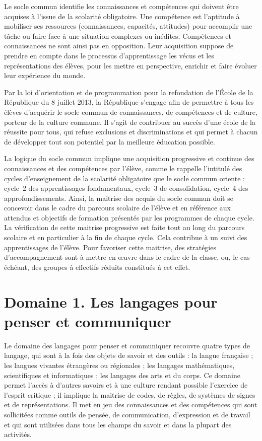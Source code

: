 Le socle commun identifie les connaissances et compétences qui doivent être acquises à l’issue de la scolarité obligatoire. Une compétence est l’aptitude à mobiliser ses ressources (connaissances, capacités, attitudes) pour accomplir une tâche ou faire face à une situation complexes ou inédites. Compétences et connaissances ne sont ainsi pas en opposition. Leur acquisition suppose de prendre en compte dans le processus d’apprentissage les vécus et les représentations des élèves, pour les mettre en perspective, enrichir et faire évoluer leur expérience du monde.

Par la loi d’orientation et de programmation pour la refondation de l’École de la République du 8 juillet 2013, la République s’engage afin de permettre à tous les élèves d’acquérir le socle commun de connaissances, de compétences et de culture, porteur de la culture commune. Il s’agit de contribuer au succès d’une école de la réussite pour tous, qui refuse exclusions et discriminations et qui permet à chacun de développer tout son potentiel par la meilleure éducation possible.
 
La logique du socle commun implique une acquisition progressive et continue des connaissances et des compétences par l’élève, comme le rappelle l’intitulé des cycles d’enseignement de la scolarité obligatoire que le socle commun oriente : cycle~2 des apprentissages fondamentaux, cycle~3 de consolidation, cycle~4 des approfondissements. Ainsi, la maitrise des acquis du socle commun doit se concevoir dans le cadre du parcours scolaire de l’élève et en référence aux attendus et objectifs de formation présentés par les programmes de chaque cycle. La vérification de cette maitrise progressive est faite tout au long du parcours scolaire et en particulier à la fin de chaque cycle. Cela contribue à un suivi des apprentissages de l’élève. Pour favoriser cette maitrise, des stratégies d’accompagnement sont à mettre en œuvre dans le cadre de la classe, ou, le cas échéant, des groupes à effectifs réduits constitués à cet effet.

\section{Domaine 1. Les langages pour penser et communiquer}
Le domaine des langages pour penser et communiquer recouvre quatre types de langage, qui sont à la fois des objets de savoir et des outils : la langue française ; les langues vivantes étrangères ou régionales ; les langages mathématiques, scientifiques et informatiques ; les langages des arts et du corps. Ce domaine permet l’accès à d’autres savoirs et à une culture rendant possible l’exercice de l’esprit critique ; il implique la maitrise de codes, de règles, de systèmes de signes et de représentations. Il met en jeu des connaissances et des compétences qui sont sollicitées comme outils de pensée, de communication, d’expression et de travail et qui sont utilisées dans tous les champs du savoir et dans la plupart des activités.

